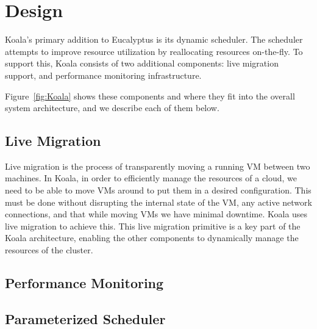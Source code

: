 \section{Design}
\label{sec:design}




    Koala's primary addition to Eucalyptus is its dynamic scheduler.  The scheduler attempts to improve resource utilization by reallocating resources on-the-fly.  To support this, Koala consists of two additional components: live migration support, and performance monitoring infrastructure.


Figure~\ref{fig:Koala} shows these components and where they fit into the
overall system architecture, and we describe each of them below.


\subsection{Live Migration}
Live migration is the process of transparently moving a running VM between two
machines.  In Koala, in order to efficiently manage the resources of a cloud,
we need to be able to move VMs around to put them in a desired configuration.
This must be done without disrupting the internal state of the VM, any active
network connections, and that while moving VMs we have minimal downtime.  Koala
uses live migration to achieve this.  This live migration primitive is a key
part of the Koala architecture, enabling the other components to dynamically
manage the resources of the cluster.

\subsection{Performance Monitoring}

\subsection{Parameterized Scheduler}

